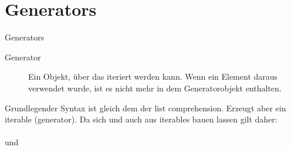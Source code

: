\section{Generators}
\begin{frame}{Generators}%
	\begin{description}
		\item[Generator] Ein Objekt, \"uber das iteriert werden kann. Wenn ein Element daraus verwendet wurde, ist es nicht mehr in dem Generatorobjekt enthalten.\\[1cm]
	\end{description}
	
  Grundlegender Syntax ist gleich dem der list comprehension. Erzeugt aber ein iterable (generator).
	Da sich  und  auch aus iterables bauen lassen gilt daher:\\

		\\
		und\\

\end{frame}





